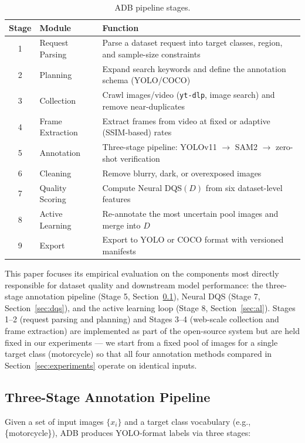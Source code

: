 \documentclass[11pt]{article}
\begin{document}
\begin{table}[h]
\centering
\caption{ADB pipeline stages.}
\label{tab:modules}
\begin{tabular}{@{}cll@{}}
\toprule
Stage & Module & Function \\
\midrule
1 & Request Parsing & Parse a dataset request into target classes, region, and sample-size constraints \\
2 & Planning & Expand search keywords and define the annotation schema (YOLO/COCO) \\
3 & Collection & Crawl images/video (\texttt{yt-dlp}, image search) and remove near-duplicates \\
4 & Frame Extraction & Extract frames from video at fixed or adaptive (SSIM-based) rates \\
5 & Annotation & Three-stage pipeline: YOLOv11 $\to$ SAM2 $\to$ zero-shot verification \\
6 & Cleaning & Remove blurry, dark, or overexposed images \\
7 & Quality Scoring & Compute Neural DQS$(D)$ from six dataset-level features \\
8 & Active Learning & Re-annotate the most uncertain pool images and merge into $D$ \\
9 & Export & Export to YOLO or COCO format with versioned manifests \\
\bottomrule
\end{tabular}
\end{table}

This paper focuses its empirical evaluation on the components most directly
responsible for dataset quality and downstream model performance: the
three-stage annotation pipeline (Stage 5, Section~\ref{sec:pipeline}), Neural
DQS (Stage 7, Section~\ref{sec:dqs}), and the active learning loop (Stage 8,
Section~\ref{sec:al}). Stages 1--2 (request parsing and planning) and Stages
3--4 (web-scale collection and frame extraction) are implemented as part of
the open-source system but are held fixed in our experiments --- we start
from a fixed pool of images for a single target class (motorcycle) so that
all four annotation methods compared in Section~\ref{sec:experiments} operate
on identical inputs.

\subsection{Three-Stage Annotation Pipeline}
\label{sec:pipeline}

Given a set of input images $\{x_i\}$ and a target class vocabulary
(e.g., \{motorcycle\}), ADB produces YOLO-format labels via three stages:
\end{document}
